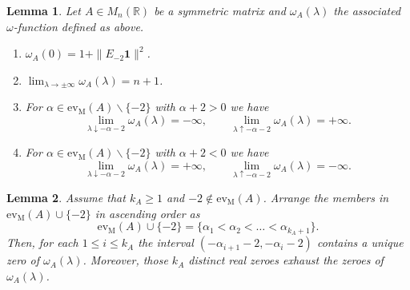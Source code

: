 \documentclass[10pt,a4paper]{amsart}
\newtheorem{lemma}{Lemma}
\begin{document}
\begin{lemma}\label{03lem:behaviour of omega(lambda)}
Let $A\in M_n(\mathbb{R})$ be a symmetric matrix
and $\omega_A(\lambda)$ the associated $\omega$-function
defined as above. 
%
\begin{enumerate}
\item[\upshape (1)] 
$\omega_A(0)=1+\|E_{-2}\mathbf{1}\|^2$.
\item[\upshape (2)] 
$\displaystyle\lim_{\lambda\rightarrow\pm\infty}\omega_A(\lambda)=n+1$.
\item[\upshape (3)]
For $\alpha\in\mathrm{ev}_{\mathrm{M}}(A)\backslash\{-2\}$ with $\alpha+2>0$
we have
\[
\lim_{\lambda\downarrow -\alpha-2}\omega_A(\lambda)=-\infty,
\qquad
\lim_{\lambda\uparrow -\alpha-2}\omega_A(\lambda)=+\infty.
\]
\item[\upshape (4)]
For $\alpha\in\mathrm{ev}_{\mathrm{M}}(A)\backslash\{-2\}$ with $\alpha+2<0$
we have
\[
\lim_{\lambda\downarrow -\alpha-2}\omega_A(\lambda)=+\infty,
\qquad
\lim_{\lambda\uparrow -\alpha-2}\omega_A(\lambda)=-\infty.
\]
\end{enumerate}
\end{lemma}

\begin{lemma}\label{03lem:zeroes of omega(lambda) (1)}
Assume that $k_A\ge1$ and $-2\not\in\mathrm{ev}_{\mathrm{M}}(A)$.
Arrange the members in $\mathrm{ev}_{\mathrm{M}}(A)\cup \{-2\}$
in ascending order as
\[
\mathrm{ev}_{\mathrm{M}}(A)\cup \{-2\}
=\{\alpha_1<\alpha_2<\dots<\alpha_{k_A+1}\}.
\]
Then, for each $1\le i\le k_A$ the interval
$(-\alpha_{i+1}-2,-\alpha_i-2)$
contains a unique zero of $\omega_A(\lambda)$.
Moreover, those $k_A$ distinct real zeroes
exhaust the zeroes of $\omega_A(\lambda)$.
\end{lemma}
\end{document}
